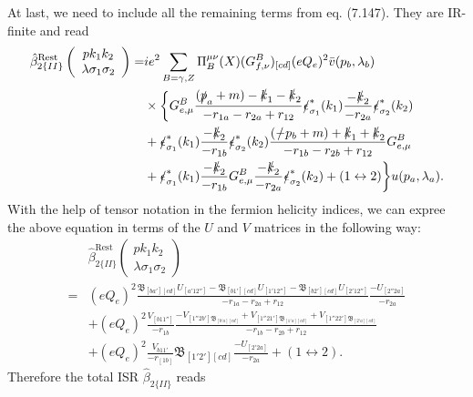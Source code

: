 At last, we need to include all the remaining terms from eq. (7.147). They are IR-finite and read
\begin{align}
\hat{\beta}^\text{Rest}_{2\{II\}}\left(\begin{array}{c}
pk_1k_2\\\lambda\sigma_1\sigma_2
\end{array}
\right)=&ie^2\sum_{B=\gamma,Z}\Pi^{\mu\nu}_B(X)(G^B_{f,\nu})_{[cd]}(eQ_e)^2\bar{v}(p_b,\lambda_b)\nonumber\\
&\times\biggl\{ G^B_{e,\mu}\frac{(\slashed p_a+m)-\slashed k_1-\slashed k_2}{-r_{1a}-r_{2a}+r_{12}}\slashed\epsilon^\ast_{\sigma_1}(k_1)\frac{-\slashed k_2}{-r_{2a}}\slashed \epsilon^\ast_{\sigma_2}(k_2)\nonumber\\
&+\slashed\epsilon^\ast_{\sigma_1}(k_1)\frac{-\slashed k_2}{-r_{1b}}\slashed \epsilon^\ast_{\sigma_2}(k_2)\frac{(\slashed -p_b+m)+\slashed k_1+\slashed k_2}{-r_{1b}-r_{2b}+r_{12}}G^B_{e,\mu}\nonumber\\  &+\slashed\epsilon^\ast_{\sigma_1}(k_1)\frac{-\slashed k_2}{-r_{1b}}G^B_{e,\mu}\frac{-\slashed k_2}{-r_{2a}}\slashed \epsilon^\ast_{\sigma_2}(k_2)+(1\leftrightarrow 2)\biggr\}u(p_a,\lambda_a).\nonumber\\
\end{align}
With the help of tensor notation in the fermion helicity indices, we can expree the above equation in terms of the $U$ and $V$ matrices in the following way:
\begin{align}
&\hat{\beta}^\text{Rest}_{2\{II\}}\left(\begin{array}{c}
pk_1k_2\\\lambda\sigma_1\sigma_2
\end{array}
\right)\nonumber\\
=&(eQ_e)^2\frac{\mathfrak{B}_{[ba'][cd]}U_{[a'12'']}-\mathfrak{B}_{[b1'][cd]}U_{[1'12'']}-\mathfrak{B}_{[b2'][cd]}U_{[2'12'']}}{-r_{1a}-r_{2a}+r_{12}}\frac{-U_{[2''2a]}}{-r_{2a}}\nonumber\\
&+(eQ_e)^2\frac{V_{[b11'']}}{-r_{1b}}\frac{-V_{[1''2b']\mathfrak{B}_{[b'a][cd]}}+V_{[1''21']\mathfrak{B}_{[1'a][cd]}}+V_{[1''22']\mathfrak{B}_{[2'a][cd]}}}{-r_{1b}-r_{2b}+r_{12}}\nonumber\\
&+(eQ_e)^2\frac{V_{{b11'}}}{-r_[1b]}\mathfrak{B}_{[1'2'][cd]}\frac{-U_{[2'2a]}}{-r_{2a}}+(1\leftrightarrow 2).
\end{align}
Therefore the total ISR $\hat{\beta}_{2\{II\}}$ reads
